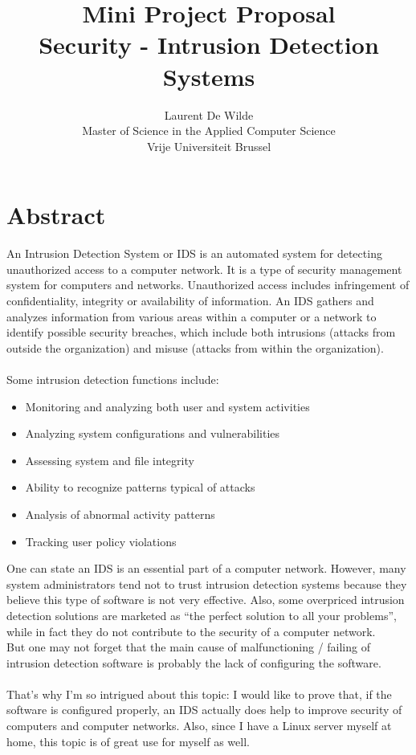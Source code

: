 \documentclass{article}
\title{Mini Project Proposal \\ \textbf{Security - Intrusion Detection Systems}}
\author{Laurent De Wilde \\ Master of Science in the Applied Computer Science \\ Vrije Universiteit Brussel}
\begin{document}
\maketitle

\section*{Abstract}

An Intrusion Detection System or IDS is an automated system for detecting unauthorized access to a computer network. It is a type of security management system for computers and networks. Unauthorized access includes infringement of confidentiality, integrity or availability of information. An IDS gathers and analyzes information from various areas within a computer or a network to identify possible security breaches, which include both intrusions (attacks from outside the organization) and misuse (attacks from within the organization). \\ \\
Some intrusion detection functions include: 
\begin{itemize}
\item    Monitoring and analyzing both user and system activities
\item    Analyzing system configurations and vulnerabilities
\item    Assessing system and file integrity
\item    Ability to recognize patterns typical of attacks
\item    Analysis of abnormal activity patterns
\item    Tracking user policy violations \\
\end{itemize}
One can state an IDS is an essential part of a computer network. However, many system administrators tend not to trust intrusion detection systems because they believe this type of software is not very effective. Also, some overpriced intrusion detection solutions are marketed as ``the perfect solution to all your problems'', while in fact they do not contribute to the security of a computer network. \\
But one may not forget that the main cause of malfunctioning / failing of intrusion detection software is probably the lack of configuring the software. \\ \\
That's why I'm so intrigued about this topic: I would like to prove that, if the software is configured properly, an IDS actually does help to improve security of computers and computer networks. Also, since I have a Linux server myself at home, this topic is of great use for myself as well. \newpage
\end{document}

